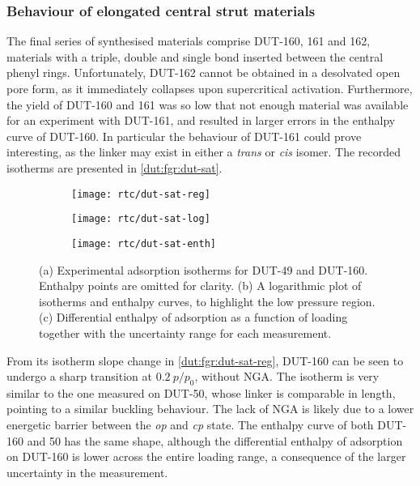 \subsubsection{Behaviour of elongated central strut materials}

The final series of synthesised materials comprise DUT-160, 
161 and 162, materials with a triple, double and single bond 
inserted between the central phenyl rings. Unfortunately, 
DUT-162 cannot be obtained in a desolvated open pore form, as it 
immediately collapses upon supercritical activation. Furthermore,
the yield of DUT-160 and 161 was so low that not enough 
material was available for an experiment with DUT-161, and resulted
in larger errors in the enthalpy curve of DUT-160. In particular 
the behaviour of DUT-161 could prove interesting, as the linker 
may exist in either a \textit{trans} or \textit{cis} isomer.
The recorded isotherms are presented in \autoref{dut:fgr:dut-sat}.

\begin{figure}[htb]
    \centering
    \begin{subfigure}{0.33\linewidth}
        \texttt{[image: rtc/dut-sat-reg]}%
        \caption{}\label{dut:fgr:dut-sat-reg}
    \end{subfigure}%
    \begin{subfigure}{0.33\linewidth}
        \texttt{[image: rtc/dut-sat-log]}%
        \caption{}\label{dut:fgr:dut-sat-log}
    \end{subfigure}%
    \begin{subfigure}{0.33\linewidth}
        \texttt{[image: rtc/dut-sat-enth]}%
        \caption{}\label{dut:fgr:dut-sat-enth}
    \end{subfigure}%
    \caption{(a) Experimental adsorption isotherms for DUT-49 and 
    DUT-160. Enthalpy points are omitted for clarity. 
    (b) A logarithmic plot of isotherms and enthalpy curves,
    to highlight the low pressure region. 
    (c) Differential enthalpy of adsorption as a function of loading
    together with the uncertainty range for each measurement.}%
    \label{dut:fgr:dut-sat}
\end{figure}

From its isotherm slope change in \autoref{dut:fgr:dut-sat-reg},
DUT-160 can be seen to undergo a sharp transition at 
\(0.2~p/p_0\), without NGA. The isotherm is very similar to the one
measured on DUT-50, whose linker is comparable in length, pointing to 
a similar buckling behaviour. The lack of NGA is likely due to 
a lower energetic barrier between the \textit{op} and \textit{cp}
state. The enthalpy curve of both DUT-160 and 50 has the same 
shape, although the differential enthalpy of adsorption on 
DUT-160 is lower across the entire loading range, a consequence of the
larger uncertainty in the measurement.

